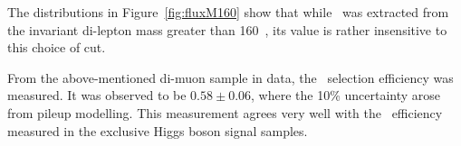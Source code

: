 \par The distributions in Figure~\ref{fig:fluxM160} show that while \fgam\ was extracted from the 
invariant di-lepton mass greater than 160~\GeV, its value is rather insensitive to this choice of 
cut.

\par From the above-mentioned di-muon sample in data, the \DZ\ selection efficiency was measured. It was 
observed to be $0.58\pm0.06$, where the 10\% uncertainty arose from pileup modelling. This measurement 
agrees very well with the \DZ\ efficiency measured 
in the exclusive Higgs boson signal samples.      
